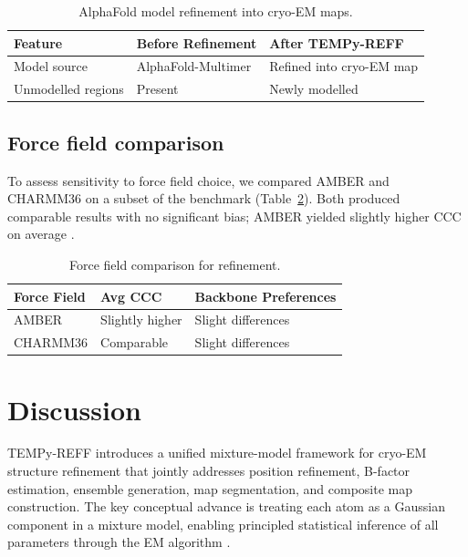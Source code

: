 \documentclass[11pt,a4paper]{article}
\begin{document}
\begin{table}[htbp]
\centering
\caption{AlphaFold model refinement into cryo-EM maps.}
\label{tab:alphafold}
\begin{tabular}{lll}
\toprule
\textbf{Feature} & \textbf{Before Refinement} & \textbf{After TEMPy-REFF} \\
\midrule
Model source & AlphaFold-Multimer & Refined into cryo-EM map \\
Unmodelled regions & Present & Newly modelled \\
\bottomrule
\end{tabular}
\end{table}

\subsection{Force field comparison}

To assess sensitivity to force field choice, we compared AMBER and CHARMM36 on a subset of the benchmark (Table~\ref{tab:forcefield}). Both produced comparable results with no significant bias; AMBER yielded slightly higher CCC on average \citep{Case2014, Huang2017}.

\begin{table}[htbp]
\centering
\caption{Force field comparison for refinement.}
\label{tab:forcefield}
\begin{tabular}{lll}
\toprule
\textbf{Force Field} & \textbf{Avg CCC} & \textbf{Backbone Preferences} \\
\midrule
AMBER & Slightly higher & Slight differences \\
CHARMM36 & Comparable & Slight differences \\
\bottomrule
\end{tabular}
\end{table}

\section{Discussion}

TEMPy-REFF introduces a unified mixture-model framework for cryo-EM structure refinement that jointly addresses position refinement, B-factor estimation, ensemble generation, map segmentation, and composite map construction. The key conceptual advance is treating each atom as a Gaussian component in a mixture model, enabling principled statistical inference of all parameters through the EM algorithm \citep{Dempster1977}.
\end{document}
